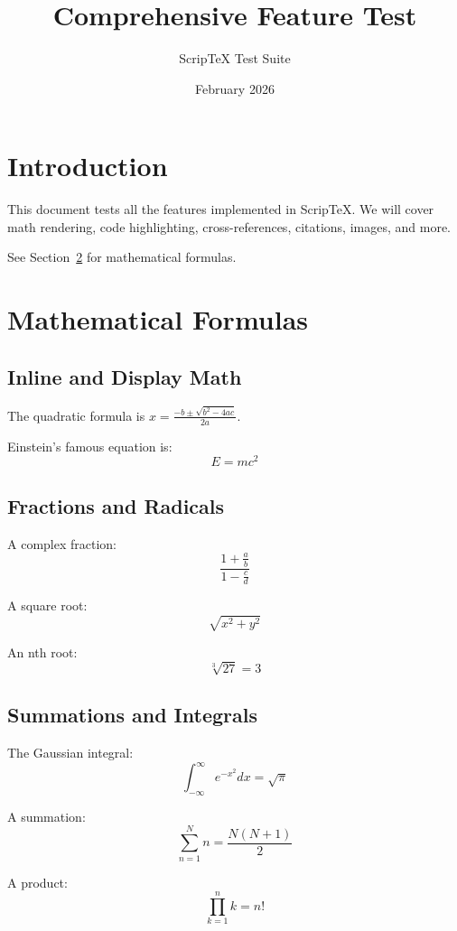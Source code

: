 \documentclass[12pt]{article}
\title{Comprehensive Feature Test}
\author{ScripTeX Test Suite}
\date{February 2026}
\begin{document}
\maketitle

\tableofcontents

\section{Introduction}
\label{sec:intro}

This document tests all the features implemented in ScripTeX.
We will cover math rendering, code highlighting, cross-references,
citations, images, and more.

See Section~\ref{sec:math} for mathematical formulas.

\section{Mathematical Formulas}
\label{sec:math}

\subsection{Inline and Display Math}

The quadratic formula is $x = \frac{-b \pm \sqrt{b^2 - 4ac}}{2a}$.

Einstein's famous equation is:
\begin{equation}
E = mc^2
\end{equation}

\subsection{Fractions and Radicals}

A complex fraction:
$$\frac{1 + \frac{a}{b}}{1 - \frac{c}{d}}$$

A square root:
$$\sqrt{x^2 + y^2}$$

An nth root:
$$\sqrt[3]{27} = 3$$

\subsection{Summations and Integrals}

The Gaussian integral:
$$\int_{-\infty}^{\infty} e^{-x^2} dx = \sqrt{\pi}$$

A summation:
$$\sum_{n=1}^{N} n = \frac{N(N+1)}{2}$$

A product:
$$\prod_{k=1}^{n} k = n!$$
\end{document}
